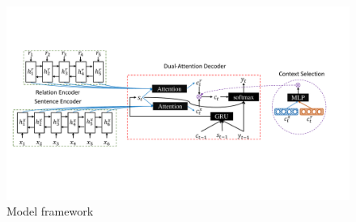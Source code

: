 \documentclass[letterpaper]{article} %
\begin{document}
	
	\begin{figure}
		\centering
		\includegraphics[width=0.99\linewidth]{model}
		\caption{Model framework}
		\label{fig:modelframework}
	\end{figure}
	
	
\end{document}

